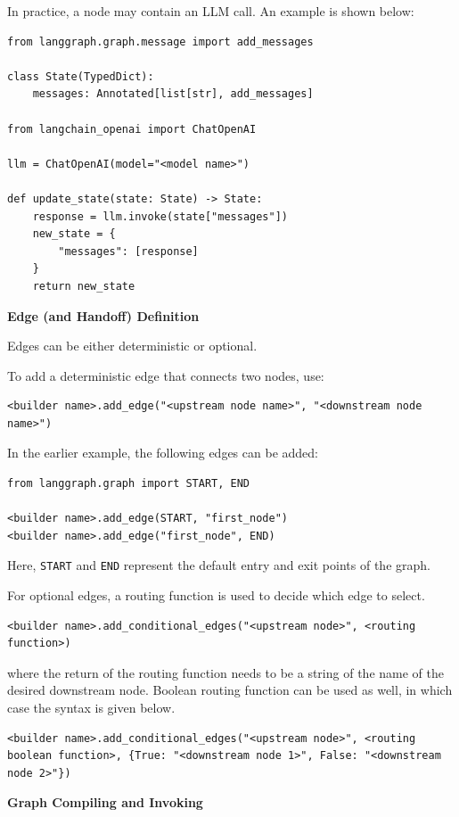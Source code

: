 In practice, a node may contain an LLM call. An example is shown below:
\begin{lstlisting}
from langgraph.graph.message import add_messages

class State(TypedDict):
    messages: Annotated[list[str], add_messages]
    
from langchain_openai import ChatOpenAI

llm = ChatOpenAI(model="<model name>")

def update_state(state: State) -> State:
    response = llm.invoke(state["messages"])
    new_state = {
        "messages": [response]
    }
    return new_state
\end{lstlisting}

\vspace{0.1in}
\noindent \textbf{Edge (and Handoff) Definition}
\vspace{0.1in}

Edges can be either deterministic or optional. 

To add a deterministic edge that connects two nodes, use:
\begin{lstlisting}
<builder name>.add_edge("<upstream node name>", "<downstream node name>")
\end{lstlisting}

In the earlier example, the following edges can be added:
\begin{lstlisting}
from langgraph.graph import START, END

<builder name>.add_edge(START, "first_node")
<builder name>.add_edge("first_node", END)
\end{lstlisting}
Here, \texttt{START} and \texttt{END} represent the default entry and exit points of the graph.

For optional edges, a routing function is used to decide which edge to select.
\begin{lstlisting}
<builder name>.add_conditional_edges("<upstream node>", <routing function>)
\end{lstlisting}
where the return of the routing function needs to be a string of the name of the desired downstream node. Boolean routing function can be used as well, in which case the syntax is given below.
\begin{lstlisting}
<builder name>.add_conditional_edges("<upstream node>", <routing boolean function>, {True: "<downstream node 1>", False: "<downstream node 2>"})
\end{lstlisting}

\vspace{0.1in}
\noindent \textbf{Graph Compiling and Invoking}
\vspace{0.1in}

